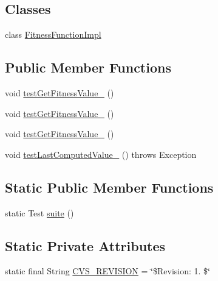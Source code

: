 \subsection*{Classes}
\begin{DoxyCompactItemize}
\item 
class \hyperlink{classorg_1_1jgap_1_1_fitness_function_test_1_1_fitness_function_impl}{Fitness\-Function\-Impl}
\end{DoxyCompactItemize}
\subsection*{Public Member Functions}
\begin{DoxyCompactItemize}
\item 
void \hyperlink{classorg_1_1jgap_1_1_fitness_function_test_a9cfebbba8d8dfc50663f8ca95a8fe14d}{test\-Get\-Fitness\-Value\-\_} ()
\item 
void \hyperlink{classorg_1_1jgap_1_1_fitness_function_test_a4bf4b7afefbd3224d2444155823b1100}{test\-Get\-Fitness\-Value\-\_} ()
\item 
void \hyperlink{classorg_1_1jgap_1_1_fitness_function_test_aab538c162ed21eef051637d7d693d30d}{test\-Get\-Fitness\-Value\-\_} ()
\item 
void \hyperlink{classorg_1_1jgap_1_1_fitness_function_test_af760c5795a95503fbad35c3f9ad375df}{test\-Last\-Computed\-Value\-\_} ()  throws Exception 
\end{DoxyCompactItemize}
\subsection*{Static Public Member Functions}
\begin{DoxyCompactItemize}
\item 
static Test \hyperlink{classorg_1_1jgap_1_1_fitness_function_test_aaf80ce864d5e0140c35ca907dd64fd29}{suite} ()
\end{DoxyCompactItemize}
\subsection*{Static Private Attributes}
\begin{DoxyCompactItemize}
\item 
static final String \hyperlink{classorg_1_1jgap_1_1_fitness_function_test_a8e330c8287f65d72eec1a90d0984b73d}{C\-V\-S\-\_\-\-R\-E\-V\-I\-S\-I\-O\-N} = \char`\"{}\$Revision\-: 1. \$\char`\"{}
\end{DoxyCompactItemize}
